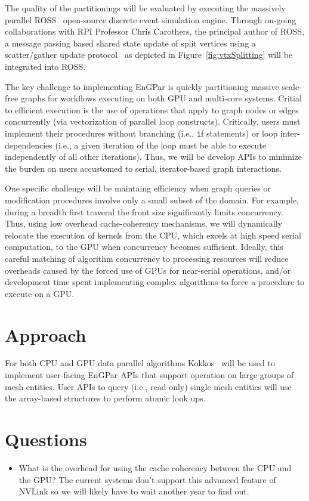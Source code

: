 \documentclass{article}
\begin{document}
The quality of the partitionings will be evaluated by executing the massively
parallel ROSS~\cite{carothers2002ross,mubarak2012modeling,barnes2013warp}
open-source discrete event simulation engine.
Through on-going collaborations with RPI Professor Chris Carothers, the principal
author of ROSS, a message passing based shared state update of split vertices
using a scatter/gather update
protocol~\cite{gonzalez2012powergraph,sahni2009scalable} as depicted in
Figure~\ref{fig:vtxSplitting} will be integrated into ROSS.

The key challenge to implementing EnGPar is quickly partitioning massive
scale-free graphs for workflows executing on both GPU and multi-core systems.
Critial to efficient execution is the use of operations that apply to graph
nodes or edges concurrently (via vectorization of parallel loop constructs).
Critically, users must implement their procedures without branching (i.e.,
{\texttt if} statements) or loop inter-dependencies
(i.e., a given iteration of the loop must be able to execute independently of
all other iterations).
Thus, we will be develop APIs to minimize the burden on users accustomed to
serial, iterator-based graph interactions.

One specific challenge will be maintaing efficiency when graph queries or
modification procedures involve only a small subset of the domain.
For example, during a breadth first traveral the front size significantly limits
concurrency.
Thus, using low overhead cache-coherency mechanisms, we will dynamically
relocate the execution of kernels from the CPU, which excels at high speed
serial computation, to the GPU when concurrency becomes sufficient.
Ideally, this careful matching of algorithm concurrency to processing resources
will reduce overheads caused by the forced use of GPUs for near-serial
operations, and/or development time spent implementing complex algorithms to
force a procedure to execute on a GPU.

\section{Approach}

For both CPU and GPU data parallel algorithms Kokkos~\cite{edwards2013kokkos}
will be used to implement user-facing EnGPar APIs that support operation on
large groups of mesh entities.
User APIs to query (i.e., read only) single mesh entities will use the
array-based structures to perform atomic look ups.

\section{Questions}
\begin{itemize}
  \item What is the overhead for using the cache coherency between the
    CPU and the GPU?
    The current systems don't support this advanced feature of NVLink so we will
    likely have to wait another year to find out.
\end{itemize}



\end{document}
